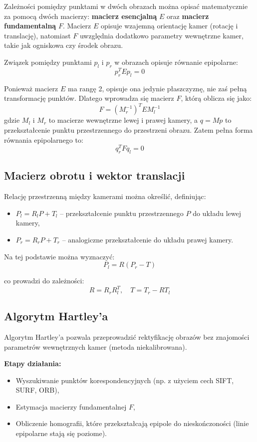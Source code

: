 \documentclass[magisterska]{pracadypl}
\begin{document}
Zależności pomiędzy punktami w dwóch obrazach można opisać matematycznie za pomocą dwóch macierzy: \textbf{macierz esencjalną} $E$ oraz \textbf{macierz fundamentalną} $F$. Macierz $E$ opisuje wzajemną orientację kamer (rotację i translację), natomiast $F$ uwzględnia dodatkowo parametry wewnętrzne kamer, takie jak ogniskowa czy środek obrazu.

Związek pomiędzy punktami $p_l$ i $p_r$ w obrazach opisuje równanie epipolarne:
\[
p_r^T E p_l = 0
\]

Ponieważ macierz $E$ ma rangę 2, opisuje ona jedynie płaszczyznę, nie zaś pełną transformację punktów. Dlatego wprowadza się macierz $F$, którą oblicza się jako:
\[
F = (M_r^{-1})^T E M_l^{-1}
\]
gdzie $M_l$ i $M_r$ to macierze wewnętrzne lewej i prawej kamery, a $q = M p$ to przekształcenie punktu przestrzennego do przestrzeni obrazu. Zatem pełna forma równania epipolarnego to:
\[
q_r^T F q_l = 0
\]

\subsection{Macierz obrotu i wektor translacji}

Relację przestrzenną między kamerami można określić, definiując:

\begin{itemize}
    \item $P_l = R_l P + T_l$ – przekształcenie punktu przestrzennego $P$ do układu lewej kamery,
    \item $P_r = R_r P + T_r$ – analogiczne przekształcenie do układu prawej kamery.
\end{itemize}

Na tej podstawie można wyznaczyć:
\[
P_l = R(P_r - T)
\]

co prowadzi do zależności:
\[
R = R_r R_l^T, \quad T = T_r - R T_l
\]


\subsection{Algorytm Hartley’a}

Algorytm Hartley’a \cite{hartley} pozwala przeprowadzić rektyfikację obrazów bez znajomości parametrów wewnętrznych kamer (metoda niekalibrowana).

\textbf{Etapy działania:}
\begin{itemize}
    \item Wyszukiwanie punktów korespondencyjnych (np. z użyciem cech SIFT, SURF, ORB),
    \item Estymacja macierzy fundamentalnej $F$,
    \item Obliczenie homografii, które przekształcają epipole do nieskończoności (linie epipolarne stają się poziome).
\end{itemize}
\end{document}
